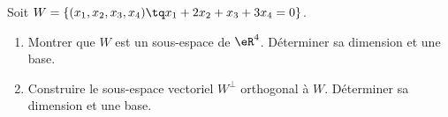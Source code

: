 

\begin{exercice}\label{exoINGE1121La0005}

	Soit $W=\{ (x_1,x_2,x_3,x_4)\tq x_1+2x_2+x_3+3x_4=0 \}$.
	\begin{enumerate}

		\item
			Montrer que $W$ est un sous-espace de $\eR^4$. Déterminer sa dimension et une base.
		\item
			Construire le sous-espace vectoriel $W^{\perp}$ orthogonal à $W$. Déterminer sa dimension et une base.

	\end{enumerate}

\end{exercice}
